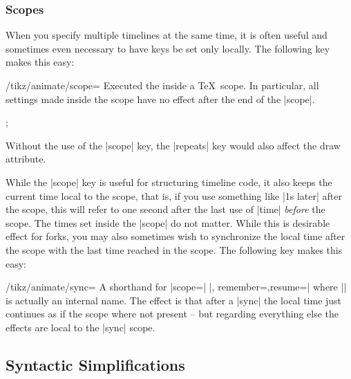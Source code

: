 \subsubsection{Scopes}
\label{section-anim-scopes}

When you specify multiple timelines at the same time, it is often useful and
sometimes even necessary to have keys be set only locally. The following key
makes this easy:

\begin{key}{/tikz/animate/scope=}
    Executed the  inside a \TeX\ scope. In particular, all
    settings made inside the scope have no effect after the end of the |scope|.
\begin{codeexample}[
    preamble={\usetikzlibrary{animations}},
    animation list={0.5,1,1.5,2},
]
\tikz {};
\end{codeexample}

    Without the use of the |scope| key, the |repeats| key would also affect the
    draw attribute.
\end{key}

While the |scope| key is useful for structuring timeline code, it also keeps
the current time local to the scope, that is, if you use something like
|1s later| after the scope, this will refer to one second after the last use of
|time| \emph{before} the scope. The times set inside the |scope| do not matter.
While this is desirable effect for forks, you may also sometimes wish to
synchronize the local time after the scope with the last time reached in the
scope. The following key makes this easy:

\begin{key}{/tikz/animate/sync=}
    A shorthand for |scope={|  |, remember=\temp},resume=\temp|
    where |\temp| is actually an internal name. The effect is that after a
    |sync| the local time just continues as if the scope where not present --
    but regarding everything else the effects are local to the |sync| scope.
\end{key}


\subsection{Syntactic Simplifications}
\label{section-anim-syntax-animate}

